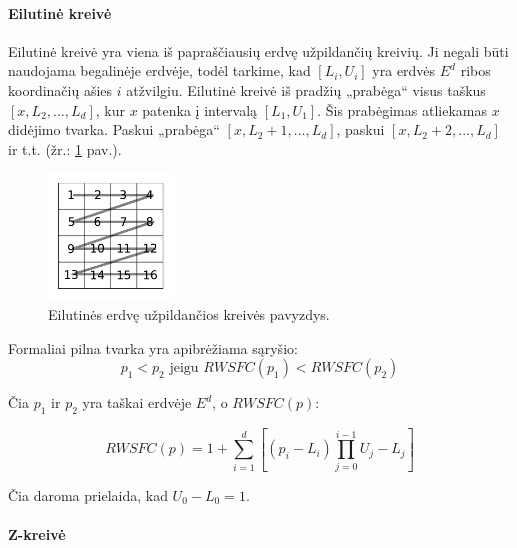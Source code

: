\paragraph{Eilutinė kreivė}

Eilutinė kreivė yra viena iš papraščiausių erdvę užpildančių kreivių.
Ji negali būti naudojama begalinėje erdvėje, todėl tarkime, kad $[L_i, U_i]$ yra erdvės $E^d$ ribos koordinačių ašies $i$ atžvilgiu.
Eilutinė kreivė iš pradžių „prabėga“ visus taškus $[x, L_2, ..., L_d]$, kur $x$ patenka į intervalą $[L_1, U_1]$.
Šis prabėgimas atliekamas $x$ didėjimo tvarka.
Paskui „prabėga“ $[x, L_2 + 1, ..., L_d]$, paskui $[x, L_2 + 2, ..., L_d]$ ir t.t. (žr.: \ref{img:RowWiseSpaceFillingCurve} pav.).

\begin{figure}[H]
\begin{center}
\includegraphics[width=0.3\textwidth]{img/RowWiseSpaceFillingCurve.png}
\caption{Eilutinės erdvę užpildančios kreivės pavyzdys.}
\label{img:RowWiseSpaceFillingCurve}
\end{center}
\end{figure}


Formaliai pilna tvarka yra apibrėžiama sąryšio:
\begin{equation}
	p_1 < p_2 \text{ jeigu } RWSFC(p_1) < RWSFC(p_2)
\label{eq:RowWiseSFCComparison}
\end{equation}

Čia $p_1$ ir $p_2$ yra taškai erdvėje $E^d$, o $RWSFC(p)$:

\begin{equation}
	RWSFC(p) = 1 + \sum_{i=1}^{d} [(p_i - L_i) \prod_{j=0}^{i - 1}U_j - L_j]
\label{eq:RowWiseSFCValue}
\end{equation}

Čia daroma prielaida, kad $U_0 - L_0 = 1$.



\paragraph{Z-kreivė}

